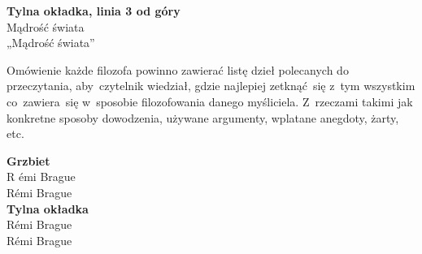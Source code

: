 \documentclass[a4paper,11pt]{article}
\begin{document}
\noindent
\textbf{Tylna okładka, linia 3 od góry} \\
\Jest  Mądrość świata \\
\Powin „Mądrość świata” \\













\newpage





\start Omówienie każde filozofa powinno zawierać listę dzieł
polecanych do przeczytania, aby~czytelnik wiedział, gdzie najlepiej
zetknąć~się z~tym wszystkim co~zawiera~się w~sposobie filozofowania
danego myśliciela. Z~rzeczami takimi jak konkretne sposoby dowodzenia,
używane argumenty, wplatane anegdoty, żarty, etc.







\vspace{\spaceTwo}


\noindent
\textbf{Grzbiet} \\
\Jest  R \'{e}mi {\small Brague} \\
\Powin R\'{e}mi Brague \\
\textbf{Tylna okładka} \\
\Jest  R\'{e}mi {\small Brague} \\
\Powin R\'{e}mi Brague \\












\end{document}
